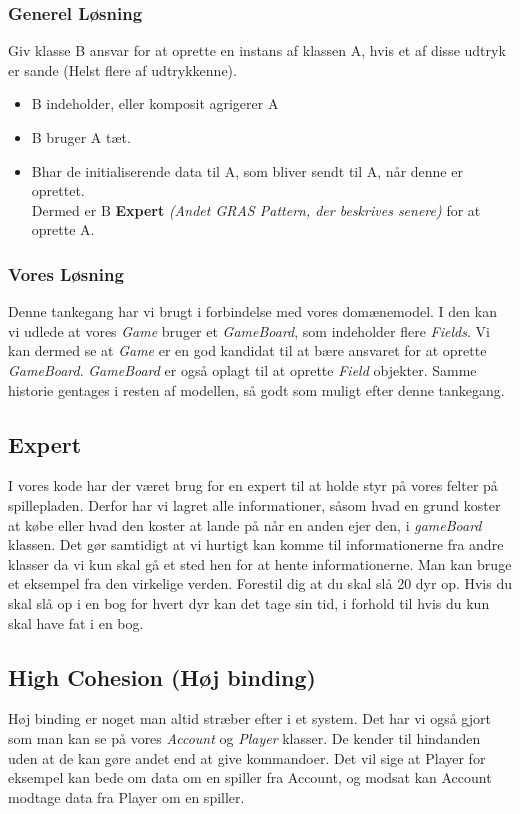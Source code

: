\subsubsection*{Generel Løsning}
Giv klasse B ansvar for at oprette en instans af klassen A, hvis et af disse udtryk er sande (Helst flere af udtrykkenne).
\begin{itemize}
\item B indeholder, eller komposit agrigerer A
\item B bruger A tæt.
\item Bhar de initialiserende data til A, som bliver sendt til A, når denne er oprettet.
\\
Dermed er B \textbf{Expert} \textit{(Andet GRAS Pattern, der beskrives senere)} for at oprette A.
\end{itemize}
\subsubsection*{Vores Løsning}
Denne tankegang har vi brugt i forbindelse med vores domænemodel. I den kan vi udlede at vores \textit{Game} bruger et \textit{GameBoard}, som indeholder flere \textit{Fields}. Vi kan dermed se at \textit{Game} er en god kandidat til at bære ansvaret for at oprette \textit{GameBoard}. \textit{GameBoard} er også oplagt til at oprette \textit{Field} objekter. Samme historie gentages i resten af modellen, så godt som muligt efter denne tankegang.
\subsection{Expert}
I vores kode har der været brug for en expert til at holde styr på vores felter på spillepladen. Derfor har vi lagret alle informationer, såsom hvad en grund koster at købe eller hvad den koster at lande på når en anden ejer den, i \textit{gameBoard} klassen. Det gør samtidigt at vi hurtigt kan komme til informationerne fra andre klasser da vi kun skal gå et sted hen for at hente informationerne. 
Man kan bruge et eksempel fra den virkelige verden. Forestil dig at du skal slå 20 dyr op. Hvis du skal slå op i en bog for hvert dyr kan det tage sin tid, i forhold til hvis du kun skal have fat i en bog.
\\
\subsection{High Cohesion (Høj binding)}
Høj binding er noget man altid stræber efter i et system. Det har vi også gjort som man kan se på vores \textit{Account} og \textit{Player} klasser. De kender til hindanden uden at de kan gøre andet end at give kommandoer. Det vil sige at Player for eksempel kan bede om data om en spiller fra Account, og modsat kan Account modtage data fra Player om en spiller. 
